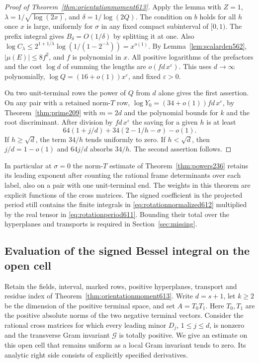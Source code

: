 \documentclass[a4paper,11pt]{article}
\theoremstyle{definition}
\theoremstyle{remark}
\numberwithin{equation}{section}
\begin{document}
\begin{proof}[Proof of Theorem~\ref{thm:orientationmoment613}]
Apply the lemma with \(Z=1\), \(\lambda=1/\sqrt{\log(2x)}\),
and \(\delta=1/\log(2Q)\). The condition on \(b\) holds for all
\(h\) once \(x\) is large, uniformly for \(\sigma\) in any fixed
compact subinterval of \([0,1)\). The prefix integral gives
\(B_\delta=O(1/\delta)\) by splitting it at one. Also
\(\log C_\lambda\le
2^{1+1/\lambda}\log(1/(1-2^{-\lambda}))=x^{o(1)}\).
By Lemma~\ref{lem:scalarden562}, \(|\mu(E)|\le8f^2\), and
\(f\) is polynomial in \(x\). All positive logarithms of the
prefactors and the cost \(\log d\) of summing the lengths are
\(o(fd\,x^\varepsilon)\). This uses \(d\to\infty\) polynomially,
\(\log Q=(16+o(1))x^\varepsilon\), and fixed \(\varepsilon>0\).

On two unit-terminal rows the power of \(Q\) from \(d\) alone
gives the first assertion. On any pair with a retained norm-\(T\)
row, \(\log Y_0=(34+o(1))fd\,x^\varepsilon\), by
Theorem~\ref{thm:prime209} with \(m=2d\) and the polynomial
bounds for \(k\) and the root discriminant. After division by
\(fd\,x^\varepsilon\) the saving for a given \(h\) is at least
\[
       64(1+j/d)+34(2-1/h-\sigma)-o(1).
\]
If \(h\ge\sqrt d\), the term \(34/h\) tends uniformly to zero.
If \(h<\sqrt d\), then \(j/d=1-o(1)\) and \(64j/d\) absorbs
\(34/h\). The second assertion follows.
\end{proof}

In particular at \(\sigma=0\) the norm-\(T\) estimate of
Theorem~\ref{thm:powers236} retains its leading exponent after
counting the rational frame determinants over each label, also
on a pair with one unit-terminal end. The weights in this theorem
are explicit functions of the cross matrices. The signed
coefficient in the projected period still contains the finite
integrals in \eqref{eq:rotationnormalized612} multiplied by the
real tensor in \eqref{eq:rotationperiod611}. Bounding their total
over the hyperplanes and transports is required in
Section~\ref{sec:missing}.


\subsection{Evaluation of the signed Bessel integral on the open cell}
\label{sec:besselsampling615}

Retain the fields, interval, marked rows, positive hyperplanes,
transport and residue index of Theorem~\ref{thm:orientationmoment613}.
Write \(d=s+1\), let \(k\ge2\) be the dimension of the positive
terminal space, and set \(A=T_0T_1\). Here \(T_0,T_1\) are the
positive absolute norms of the two negative terminal vectors.
Consider the rational cross matrices for which every leading
minor \(D_j\), \(1\le j\le d\), is nonzero and the transverse
Gram invariant \(\mathcal G\) is totally positive. We give an
estimate on this open cell that remains uniform as a local
Gram invariant tends to zero. Its analytic right side consists
of explicitly specified derivatives.
\end{document}
